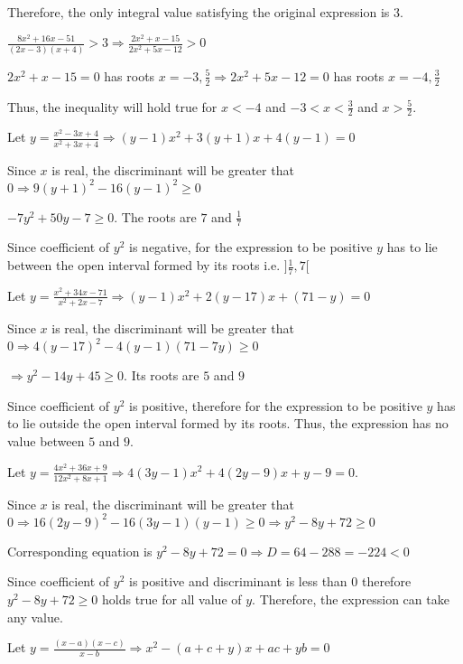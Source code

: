   Therefore, the only integral value satisfying the original expression is $3$.
\item $\frac{8x^2 + 16x - 51}{(2x - 3)(x + 4)} > 3\Rightarrow \frac{2x^2 + x - 15}{2x^2 + 5x - 12} > 0$

  $2x^2 + x - 15 = 0$ has roots $x = -3 , \frac{5}{2}\Rightarrow 2x^2 + 5x - 12 = 0$ has roots $x = -4,
  \frac{3}{2}$

  Thus, the inequality will hold true for $x < -4$ and $-3 < x < \frac{3}{2}$ and $x > \frac{5}{2}$.
\item Let $y = \frac{x^2 - 3x + 4}{x^2 + 3x + 4}\Rightarrow (y - 1)x^2 + 3(y + 1)x + 4(y - 1) = 0$

  Since $x$ is real, the discriminant will be greater that $0 \Rightarrow 9(y + 1)^2 - 16(y - 1)^2 \ge 0$

  $-7y^2 + 50y - 7 \ge 0$. The roots are $7$ and $\frac{1}{7}$

  Since coefficient of $y^2$ is negative, for the expression to be positive $y$ has to lie between the
  open interval formed by its roots i.e. $]\frac{1}{7}, 7[$
\item Let $y = \frac{x^2 + 34x - 71}{x^2 + 2x - 7}\Rightarrow (y - 1)x^2 + 2(y - 17)x + (71 - y) = 0$

  Since $x$ is real, the discriminant will be greater that $0\Rightarrow 4(y - 17)^2 - 4(y - 1)(71 - 7y) \ge
  0$

  $\Rightarrow y^2 - 14y + 45 \ge 0$. Its roots are $5$ and $9$

  Since coefficient of $y^2$ is positive, therefore for the expression to be positive $y$ has to lie outside
  the open interval formed by its roots. Thus, the expression has no value between $5$ and $9$.
\item Let $y = \frac{4x^2 + 36x + 9}{12x^2 + 8x + 1}\Rightarrow 4(3y - 1)x^2 + 4(2y - 9)x + y - 9 = 0$.

  Since $x$ is real, the discriminant will be greater that $0\Rightarrow 16(2y - 9)^2 - 16(3y - 1)(y - 1)
  \ge 0\Rightarrow y^2 - 8y + 72 \ge 0$

  Corresponding equation is $y^2 - 8y + 72 = 0\Rightarrow D = 64 - 288 = -224 < 0$

  Since coefficient of $y^2$ is positive and discriminant is less than $0$ therefore $y^2 - 8y + 72 \ge 0$
  holds true for all value of $y$. Therefore, the expression can take any value.
\item Let $y = \frac{(x - a)(x - c)}{x -b}\Rightarrow x^2 - (a + c + y)x + ac + yb = 0$

